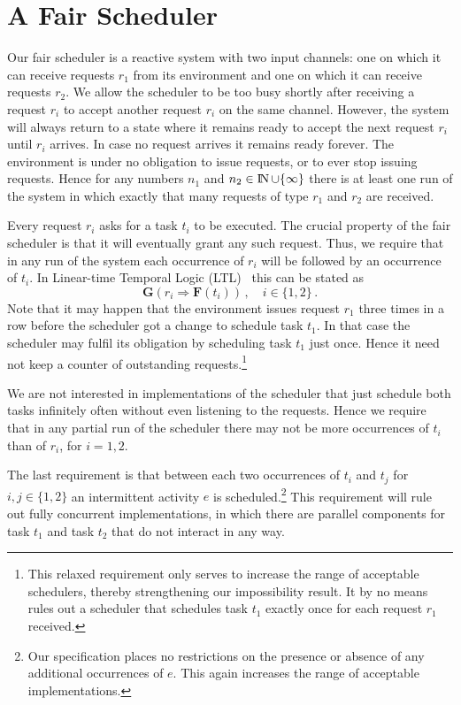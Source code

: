 \documentclass[smallcondensed]{svjour3}
\newcounter {part}
\begin{document}
\section{A Fair Scheduler}\label{sec:fair scheduler}


Our fair scheduler is a reactive system with two input channels: one
on which it can receive requests $r_1$ from its environment and
one on which it can receive requests $r_2$. We allow the scheduler to
be too busy shortly after receiving a request $r_i$ to accept another
request $r_i$ on the same channel. However, the system will always
return to a state where it remains ready to accept the next request $r_i$
until $r_i$ arrives. In case no request arrives it 
remains ready forever. The environment is under no
obligation to issue requests, or to ever stop issuing requests.
Hence for any numbers $n_1$ and $n_2\in\mathop{\rm I\mkern-2.5mu N}\nolimits \cup\{\infty\}$ there is at least one run of the system in
which exactly that many requests of type $r_1$ and $r_2$ are received.

Every request $r_i$ asks for a task $t_i$ to be executed.
The crucial property of the fair scheduler is that it will eventually
grant any such request. Thus, we require that in any run of the system
each occurrence of $r_i$ will be followed by an occurrence of $t_i$.
In Linear-time Temporal Logic (LTL)~\cite{Pnueli77} this can be stated as
\[
\mathbf{G}(r_i \Rightarrow \mathbf{F}(t_i))\,,\quad i\in\{1,2\}\,.
\]
\noindent
Note that it may happen that the environment issues request $r_1$
three times in a row before the scheduler got a change to schedule
task $t_1$. In that case the scheduler may fulfil its obligation by
scheduling task $t_1$ just once. Hence it need not keep a counter of
outstanding requests.\footnote{This relaxed requirement only
  serves to increase the range of acceptable schedulers, thereby
  strengthening our impossibility result. It by no means rules out a
  scheduler that schedules task $t_1$ exactly once for each request
  $r_1$ received.}

We are not interested in implementations of the scheduler that just
schedule both tasks infinitely often without even listening to the
requests. Hence we require that in any partial run of the scheduler
there may not be more occurrences of $t_i$ than of $r_i$, for $i=1,2$.

The last requirement is that between each two occurrences of $t_i$ and
$t_j$ for $i,j\in\{1,2\}$ an intermittent activity $e$ is
scheduled.\footnote{Our specification places no restrictions on the
  presence or absence of any additional occurrences of $e$. This again
  increases the range of acceptable implementations.}
This requirement will rule out fully concurrent implementations, in
which there are parallel components for task $t_{1}$ and task $t_{2}$ that do not
interact in any way.
\end{document}
